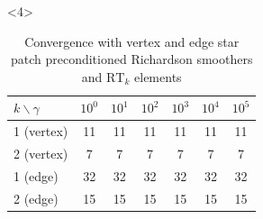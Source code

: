 \documentclass[presentation,aspectratio=43,10pt]{beamer}
\newcommand{\convexpath}[2]{
  [
  create hullcoords/.code={
    \global\edef\namelist{#1}
    \foreach [count=\counter] \nodename in \namelist {
      \global\edef\numberofnodes{\counter}
      \coordinate (hullcoord\counter) at (\nodename);
    }
    \coordinate (hullcoord0) at (hullcoord\numberofnodes);
    \pgfmathtruncatemacro\lastnumber{\numberofnodes+1}
    \coordinate (hullcoord\lastnumber) at (hullcoord1);
  },
  create hullcoords
  ]
  ($(hullcoord1)!#2!-90:(hullcoord0)$)
  \foreach [
  evaluate=\currentnode as \previousnode using \currentnode-1,
  evaluate=\currentnode as \nextnode using \currentnode+1
  ] \currentnode in {1,...,\numberofnodes} {
    let \p1 = ($(hullcoord\currentnode) - (hullcoord\previousnode)$),
    \n1 = {atan2(\y1,\x1) + 90},
    \p2 = ($(hullcoord\nextnode) - (hullcoord\currentnode)$),
    \n2 = {atan2(\y2,\x2) + 90},
    \n{delta} = {Mod(\n2-\n1,360) - 360}
    in
    {arc [start angle=\n1, delta angle=\n{delta}, radius=#2]}
    -- ($(hullcoord\nextnode)!#2!-90:(hullcoord\currentnode)$)
  }
}
\begin{document}
\begin{frame}[fragile]
\begin{onlyenv}
\begin{columns}
\begin{column}{0.4\textwidth}
\begin{center}
        \end{center}
      \end{column}
    \end{columns}
  \end{onlyenv}
  \begin{onlyenv}<4>
    \begin{table}
      \centering
      {\footnotesize
      \begin{tabular}{l|cccccc}
        $k\backslash \gamma$ & $10^0$ & $10^1$ & $10^2$ & $10^3$ & $10^4$ & $10^5$ \\
        \hline
        1 (vertex)           & 11     & 11     & 11     & 11     & 11     & 11     \\
        2 (vertex)           & 7      & 7      & 7      & 7      & 7      & 7      \\
        1 (edge)             & 32     & 32     & 32     & 32     & 32     & 32     \\
        2 (edge)             & 15     & 15     & 15     & 15     & 15     & 15     \\
      \end{tabular}
      \caption{Convergence with vertex and edge star patch preconditioned Richardson
        smoothers and $\text{RT}_k$ elements}
      }
    \end{table}
  \end{onlyenv}
\end{frame}
\end{document}
